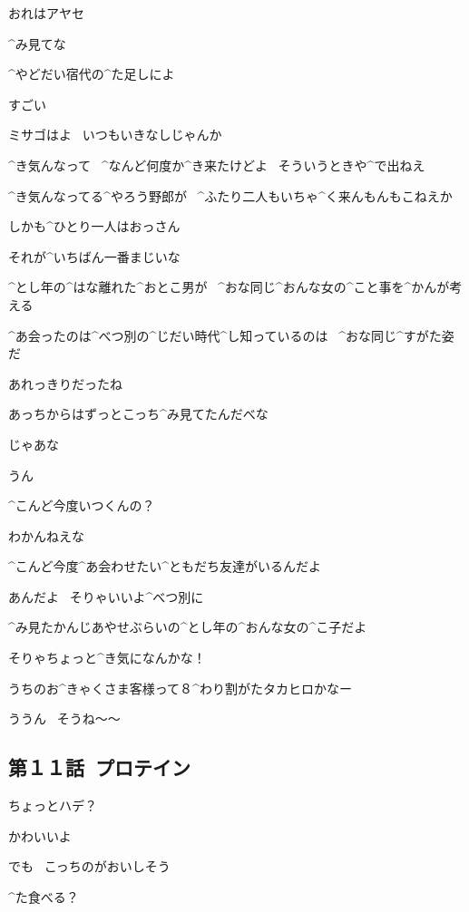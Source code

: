 \Ayase おれはアヤセ

\Ayase ^{み}{見}てな

\page[44]
\Ayase ^{やどだい}{宿代}の^{た}{足}しによ

\Takahiro すごい

\Ayase ミサゴはよ
\ いつもいきなしじゃんか

\page
\Ayase ^{き}{気}んなって
\ ^{なんど}{何度}か^{き}{来}たけどよ
\ そういうときや^{で}{出}ねえ

\Ayase ^{き}{気}んなってる^{やろう}{野郎}が
\ ^{ふたり}{二人}もいちゃ^{く}{来}んもんもこねえか

\Takahiro しかも^{ひとり}{一人}はおっさん

\Ayase それが^{いちばん}{一番}まじいな

\Narrator ^{とし}{年}の^{はな}{離}れた^{おとこ}{男}が
\ ^{おな}{同}じ^{おんな}{女}の^{こと}{事}を^{かんが}{考}える

\Narrator ^{あ}{会}ったのは^{べつ}{別}の^{じだい}{時代}^{し}{知}っているのは
\ ^{おな}{同}じ^{すがた}{姿}だ

\page[48]
\Ayase あれっきりだったね

\Ayase あっちからはずっとこっち^{み}{見}てたんだべな

\Ayase じゃあな

\Takahiro うん

\Takahiro ^{こんど}{今度}いつくんの？

\Ayase わかんねえな

\page
\Takahiro ^{こんど}{今度}^{あ}{会}わせたい^{ともだち}{友達}がいるんだよ

\Ayase あんだよ
\ そりゃいいよ^{べつ}{別}に

\Takahiro ^{み}{見}たかんじあやせぶらいの^{とし}{年}の^{おんな}{女}の^{こ}{子}だよ

\Ayase そりゃちょっと^{き}{気}になんかな！

\page
\Alpha うちのお^{きゃくさま}{客様}って８^{わり}{割}がたタカヒロかなー

\Alpha ううん
\ そうね〜〜


\subsection{第１１話\ プロテイン}

\page[52]
\Alpha ちょっとハデ？

\Kokone かわいいよ

\page
\Kokone でも
\ こっちのがおいしそう

\Kokone ^{た}{食}べる？

